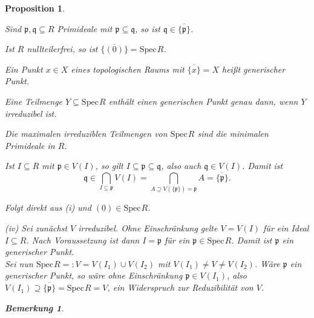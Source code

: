 \documentclass[11pt]{book}
\newtheorem{proposition}[theorem]{Proposition}
\newtheorem{remark}[theorem]{Bemerkung}
\theoremstyle{nonumberbreak}
\newenvironment{pr}[1][]{\ifthenelse{\equal{#1}{}}{\proof}{\proof[#1]}\rm}{\endproof}
\newenvironment{bemdefin}[1][]{\ifthenelse{\equal{#1}{}}{\bemdefini}{\bemdefini[#1]}\rm}{\endbemdefini}
\newcommand{\spec}{\mathrm{Spec} \hspace{1pt} }
\newcommand{\p}{\mathfrak{p}}
\newcommand{\q}{\mathfrak{q}}
\newcommand{\ideal}{\subseteq}
\begin{document}
\begin{spacing}{1.4}
\begin{proposition}
\begin{bemdefin}   %
\begin{compactenum}
\item Sind $\p, \q \ideal R$ Primideale mit $\p \subseteq \q$, so ist $\q \in \overline{ \{\p\} }$.
\item Ist $R$ nullteilerfrei, so ist $\overline{\{ ( 0 ) \}} = \spec R$.
\item Ein Punkt $x \in X$ eines topologischen Raums mit $\overline{\{ x \}} = X$ heißt \textit{generischer Punkt}.
\item Eine Teilmenge $Y\subseteq \spec R$ enthält einen generischen Punkt genau dann, wenn $Y$ irreduzibel ist.
\item Die maximalen irreduziblen Teilmengen von $\spec R$ sind die minimalen Primideale in $R$.
\end{compactenum}
\begin{pr}
\begin{compactenum}
\item Ist $I \ideal R$ mit $\p \in V(I)$, so gilt $I \subseteq \p \subseteq \q$, also auch $\q \in V(I)$. Damit ist 
$$\q \in \bigcap_{I \subseteq \p} V(I) = \bigcap_{A \supseteq V(\{\p\})=\p} A =\overline{ \{ \p \} }.$$
\item Folgt direkt aus (i) und $( 0 ) \in \spec R$.
\item[(iv)] Sei zunächst $V$ irreduzibel. Ohne Einschränkung gelte $V=V(I)$ für ein Ideal $I \ideal R$. Nach Voraussetzung ist dann $I= \p$ für ein $\p \in \spec R$. Damit ist $\p$ ein generischer Punkt.\\
Sei nun $\spec R=:V=V(I_1) \cup V(I_2)$ mit $V(I_1) \neq V \neq V(I_2)$. Wäre $\p$ ein generischer Punkt, so wäre ohne Einschränkung $\p \in V(I_1)$, also $V(I_1) \supseteq \overline{ \{ \p \} } = \spec R = V$, ein Widerspruch zur Reduzibilität von $V$.

\end{compactenum}
\end{pr}

\end{bemdefin}




\begin{remark}   %


\end{remark}
\end{proposition}
\end{spacing}
\end{document}
